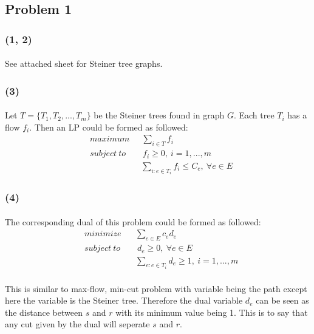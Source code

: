 \subsection*{Problem 1}
\subsubsection*{(1, 2)}
\paragraph{}
See attached sheet for Steiner tree graphs.
\subsubsection*{(3)}
\paragraph{}
Let $T=\{T_1, T_2,...,T_m\}$ be the Steiner trees found in graph $G$. Each tree $T_i$ has a flow $f_i$. Then an LP could be formed as followed:
\begin{align*}
& maximum \quad \ \ \sum_{i \in T} f_i\\
& subject \ to \qquad f_i \geq 0, \ i = 1,...,m \\
&\qquad \qquad \quad \quad \sum_{i:e\in T_i} f_i \leq C_e, \ \forall e \in E
\end{align*}
\subsubsection*{(4)}
\paragraph{}
The corresponding dual of this problem could be formed as followed:
\begin{align*}
& minimize \quad \ \ \  \sum_{e\in E} c_e d_e\\
& subject \ to \qquad d_e \geq 0, \ \forall e \in E  \\
&\qquad \qquad \quad \quad \sum_{e:e\in T_i} d_e \geq 1, \  i = 1,...,m
\end{align*}
\paragraph{}
This is similar to max-flow, min-cut problem with variable being the path except here the variable is the Steiner tree. Therefore the dual variable $d_e$ can be seen as the distance between $s$ and $r$ with its minimum value being 1. This is to say that any cut given by the dual will seperate $s$ and $r$.